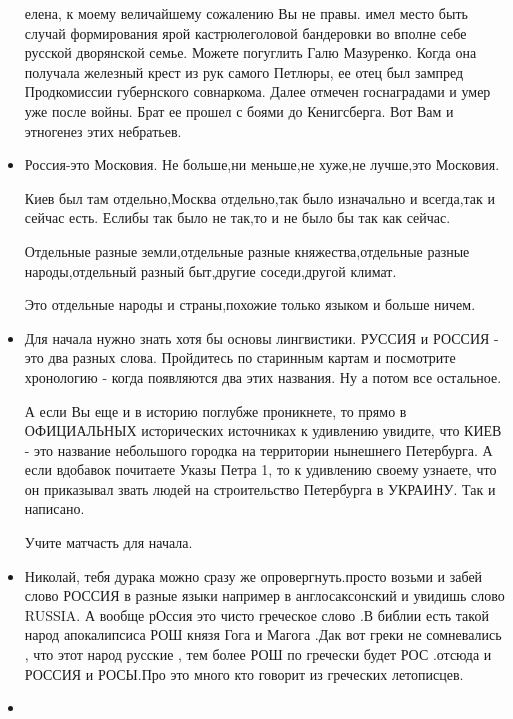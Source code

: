 \begin{itemize}
елена, к моему величайшему сожалению Вы не правы. имел место быть случай
формирования ярой кастрюлеголовой бандеровки во вполне себе русской дворянской
семье. Можете погуглить Галю Мазуренко. Когда она получала железный крест из
рук самого Петлюры, ее отец был зампред Продкомиссии губернского совнаркома.
Далее отмечен госнаградами и умер уже после войны. Брат ее прошел с боями до
Кенигсберга. Вот Вам и этногенез этих небратьев.

\item {}

Россия-это Московия. Не больше,ни меньше,не хуже,не лучше,это Московия.

Киев был там отдельно,Москва отдельно,так было изначально и всегда,так и сейчас
есть. Еслибы так было не так,то и не было бы так как сейчас.

Отдельные разные земли,отдельные разные княжества,отдельные разные
народы,отдельный разный быт,другие соседи,другой климат.

Это отдельные народы и страны,похожие только языком и больше ничем.

\item {}

Для начала нужно знать хотя бы основы лингвистики. РУССИЯ и РОССИЯ - это два
разных слова. Пройдитесь по старинным картам и посмотрите хронологию - когда
появляются два этих названия. Ну а потом все остальное.

А если Вы еще и в историю поглубже проникнете, то прямо в ОФИЦИАЛЬНЫХ
исторических источниках к удивлению увидите, что КИЕВ - это название небольшого
городка на территории нынешнего Петербурга. А если вдобавок почитаете Указы
Петра 1, то к удивлению своему узнаете, что он приказывал звать людей на
строительство Петербурга в УКРАИНУ. Так и написано.

Учите матчасть для начала.

\item {}

Николай, тебя дурака можно сразу же опровергнуть.просто возьми и забей слово
РОССИЯ в разные языки например в англосаксонский и увидишь слово RUSSIA. А
вообще рОссия это чисто греческое слово .В библии есть такой народ апокалипсиса
РОШ князя Гога и Магога .Дак вот греки не сомневались , что этот народ русские
, тем более РОШ по гречески будет РОС .отсюда и РОССИЯ и РОСЫ.Про это много кто
говорит из греческих летописцев.

\item {}


\end{itemize}
